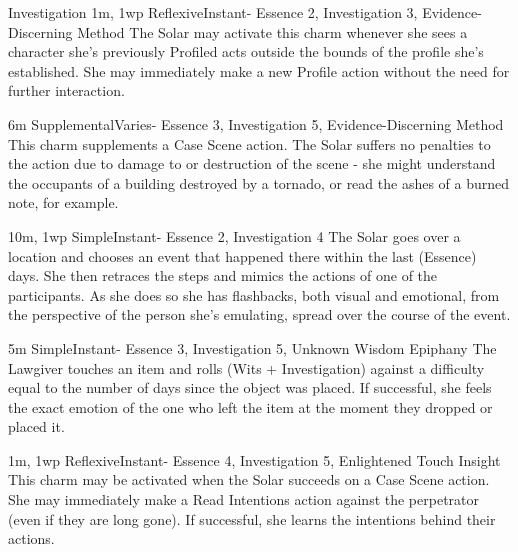 \begin{Ability}{Investigation}
  {1m, 1wp}
  {Reflexive}{Instant}{-}
  {Essence 2, Investigation 3, Evidence-Discerning Method}
  The Solar may activate this charm whenever she sees a character she's previously Profiled acts outside the bounds of the profile she's established. She may immediately make a new Profile action without the need for further interaction.

  {6m}
  {Supplemental}{Varies}{-}
  {Essence 3, Investigation 5, Evidence-Discerning Method}
  This charm supplements a Case Scene action. The Solar suffers no penalties to the action due to damage to or destruction of the scene - she might understand the occupants of a building destroyed by a tornado, or read the ashes of a burned note, for example.

  {10m, 1wp}
  {Simple}{Instant}{-}
  {Essence 2, Investigation 4}
  The Solar goes over a location and chooses an event that happened there within the last (Essence) days. She then retraces the steps and mimics the actions of one of the participants. As she does so she has flashbacks, both visual and emotional, from the perspective of the person she's emulating, spread over the course of the event.

  {5m}
  {Simple}{Instant}{-}
  {Essence 3, Investigation 5, Unknown Wisdom Epiphany}
  The Lawgiver touches an item and rolls (Wits + Investigation) against a difficulty equal to the number of days since the object was placed. If successful, she feels the exact emotion of the one who left the item at the moment they dropped or placed it.

  {1m, 1wp}
  {Reflexive}{Instant}{-}
  {Essence 4, Investigation 5, Enlightened Touch Insight}
  This charm may be activated when the Solar succeeds on a Case Scene action. She may immediately make a Read Intentions action against the perpetrator (even if they are long gone). If successful, she learns the intentions behind their actions.

\end{Ability}

